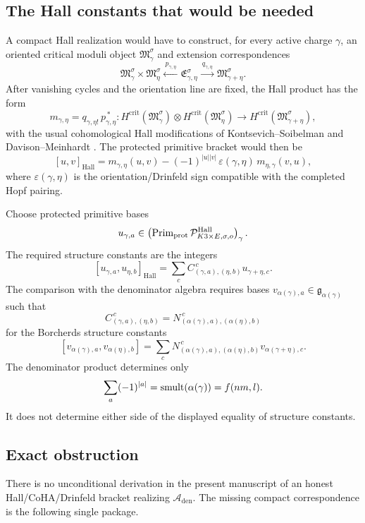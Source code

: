 \subsection{The Hall constants that would be needed}

A compact Hall realization would have to construct, for every active
charge \(\gamma\), an oriented critical moduli object
\(\mathfrak M_\gamma^\sigma\) and extension correspondences
$$
\mathfrak M_\gamma^\sigma\times\mathfrak M_\eta^\sigma
\xleftarrow{\ p_{\gamma,\eta}\ }
\mathfrak E_{\gamma,\eta}^\sigma
\xrightarrow{\ q_{\gamma,\eta}\ }
\mathfrak M_{\gamma+\eta}^\sigma.
$$
After vanishing cycles and the orientation line are fixed, the Hall
product has the form
$$
m_{\gamma,\eta}
=q_{\gamma,\eta!}\,p_{\gamma,\eta}^{\,*}
:
H^{\mathrm{crit}}(\mathfrak M_\gamma^\sigma)
\otimes
H^{\mathrm{crit}}(\mathfrak M_\eta^\sigma)
\longrightarrow
H^{\mathrm{crit}}(\mathfrak M_{\gamma+\eta}^\sigma),
$$
with the usual cohomological Hall modifications of
Kontsevich--Soibelman and Davison--Meinhardt \cite{KSCoHA,DavisonMeinhardtCoHA}.
The protected primitive bracket would then be
$$
[u,v]_{\mathrm{Hall}}
=m_{\gamma,\eta}(u,v)
-(-1)^{|u||v|}\,\varepsilon(\gamma,\eta)\,
m_{\eta,\gamma}(v,u),
$$
where \(\varepsilon(\gamma,\eta)\) is the orientation/Drinfeld sign
compatible with the completed Hopf pairing.

Choose protected primitive bases
$$
u_{\gamma,a}\in
\left(\operatorname{Prim}_{\mathrm{prot}}
\mathcal P^{\mathrm{Hall}}_{K3\times E,\sigma,o}\right)_\gamma .
$$
The required structure constants are the integers
$$
[u_{\gamma,a},u_{\eta,b}]_{\mathrm{Hall}}
=
\sum_c
C^{\,c}_{(\gamma,a),(\eta,b)}
u_{\gamma+\eta,c}.
$$
The comparison with the denominator algebra requires bases
\(v_{\alpha(\gamma),a}\in\mathfrak g_{\alpha(\gamma)}\) such that
$$
C^{\,c}_{(\gamma,a),(\eta,b)}
=
N^{\,c}_{(\alpha(\gamma),a),(\alpha(\eta),b)}
$$
for the Borcherds structure constants
$$
[v_{\alpha(\gamma),a},v_{\alpha(\eta),b}]
=
\sum_c
N^{\,c}_{(\alpha(\gamma),a),(\alpha(\eta),b)}
v_{\alpha(\gamma+\eta),c}.
$$
The denominator product determines only
$$
\sum_a(-1)^{|a|}
=\operatorname{smult}(\alpha(\gamma))=f(nm,l).
$$
It does not determine either side of the displayed equality of
structure constants.

\subsection{Exact obstruction}

There is no unconditional derivation in the present manuscript of an
honest Hall/CoHA/Drinfeld bracket realizing
\(\mathcal A_{\mathrm{den}}\).  The missing compact correspondence is
the following single package.

